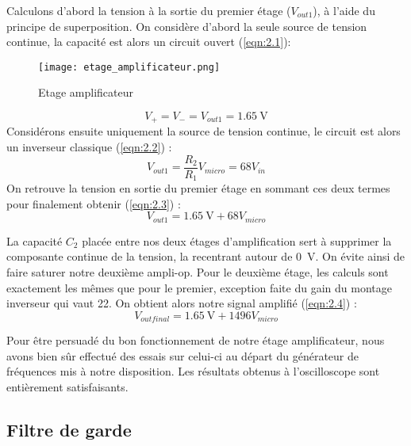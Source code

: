 Calculons d'abord la tension à la sortie du premier étage ($V_{out 1}$), à l'aide du principe de superposition. On considère d'abord la seule source de tension continue, la capacité est alors un circuit ouvert (\ref{eqn:2.1}):
\begin{figure}
\centering
\texttt{[image: etage\_amplificateur.png]}
\caption{Etage amplificateur}
\label{fig:etage amplificateur}
\end{figure}
\begin{equation}
V_{+} = V_{-} = V_{out 1} = \SI{1.65}{\volt}
\label{eqn:2.1}
\end{equation}
Considérons ensuite uniquement la source de tension continue, le circuit est alors un inverseur classique (\ref{eqn:2.2}) : 
\begin{equation}
V_{out 1} = \frac{R_2}{R_1} V_{micro} = 68 V_{in}
\label{eqn:2.2}
\end{equation}
On retrouve la tension en sortie du premier étage en sommant ces deux termes pour finalement obtenir (\ref{eqn:2.3}) :
\begin{equation}
V_{out 1} = \SI{1.65}{\volt} + 68 V_{micro}
\label{eqn:2.3}
\end{equation}

La capacité $C_{2}$ placée entre nos deux étages d'amplification sert à supprimer la composante continue de la tension, la recentrant autour de \SI{0}{\volt}. On évite ainsi de faire saturer notre deuxième ampli-op. Pour le deuxième étage, les calculs sont exactement les mêmes que pour le premier, exception faite du gain du montage inverseur qui vaut 22. On obtient alors notre signal amplifié (\ref{eqn:2.4}) : 
\begin{equation}
V_{out final} = \SI{1.65}{\volt} + 1496 V_{micro}
\label{eqn:2.4}
\end{equation}

Pour être persuadé du bon fonctionnement de notre étage amplificateur, nous avons bien sûr effectué des essais sur celui-ci au départ du générateur de fréquences mis à notre disposition. Les résultats obtenus à l'oscilloscope sont entièrement satisfaisants. 

\subsection{Filtre de garde}
